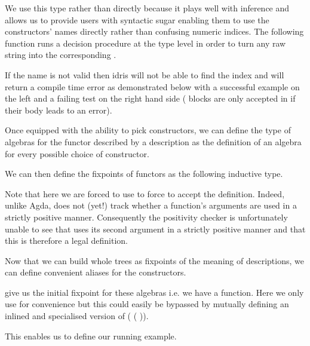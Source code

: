 
We use this type rather than  directly because it
plays well with inference and allows us to provide users with
syntactic sugar enabling them to use the constructors' names
directly rather than confusing numeric indices.
%
The following function runs a decision procedure
 at the type level
in order to turn any raw string 
into the corresponding .


If the name is not valid then idris will not be able to
find the index and will return a compile time error as demonstrated
below with a successful example on the left and a failing test
on the right hand side ( blocks are only
accepted in \idris{} if their body leads to an error).

\begin{minipage}[t]{0.3\textwidth}
\end{minipage}\hfill
\begin{minipage}[t]{0.5\textwidth}
\end{minipage}

Once equipped with the ability to pick constructors, we can define
the type of algebras for the functor described by a 
description as the definition of an algebra for every possible choice
of constructor.


We can then define the fixpoints of functors as the following
inductive type.


%
Note that here we are forced to use \assertTotal{} to force \idris{}
to accept the definition.
%
Indeed, unlike Agda, \idris{} does not (yet!) track whether a function's
arguments are used in a strictly positive manner.
%
Consequently the positivity checker
is unfortunately unable to see that  uses its second
argument in a strictly positive manner
and that this is therefore a legal definition.

Now that we can build whole trees as fixpoints of the
meaning of descriptions, we can define convenient aliases for
the  constructors.



 give us the initial fixpoint for these algebras i.e.
we have a  function. Here we only use \assertTotal{}
for convenience but this could easily be bypassed by mutually defining
an inlined and specialised version of
( ( )).


This enables us to define our running example.

